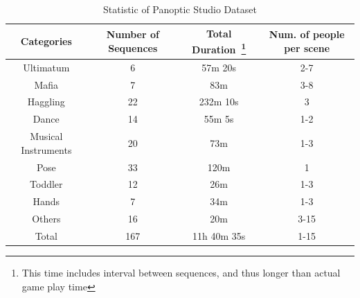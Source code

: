 \begin{table}[h]
	\centering
	\caption{Statistic of Panoptic Studio Dataset}
	\label{table:dataset}
	\begin{tabular}{c| c | c | c }
		\hline	
		Categories & Number of Sequences  & Total Duration~\footnote{This time includes interval between sequences, and thus longer than actual game play time}  & Num. of people per scene \\
		\hline	
		Ultimatum &  6 & 57m 20s & 2-7   \\
		\hline	
		Mafia &  7 &  83m & 3-8   \\
		\hline	
		Haggling & 22  & 232m 10s  & 3   \\
		\hline	
		Dance&  14& 55m 5s & 1-2   \\
		\hline	
		Musical Instruments& 20 & 73m  & 1-3  \\
		\hline	
		Pose& 33 & 120m  & 1  \\ 
		\hline	
		Toddler& 12 & 26m & 1-3  \\ 
		\hline	
		Hands&  7 &  34m & 1-3  \\ 
		\hline	
		Others& 16 & 20m & 3-15 \\
		\hline	
		\hline	
		Total& 167 & 11h 40m 35s & 1-15\\
		\hline	
	\end{tabular}
\end{table}

%
%

\pagebreak